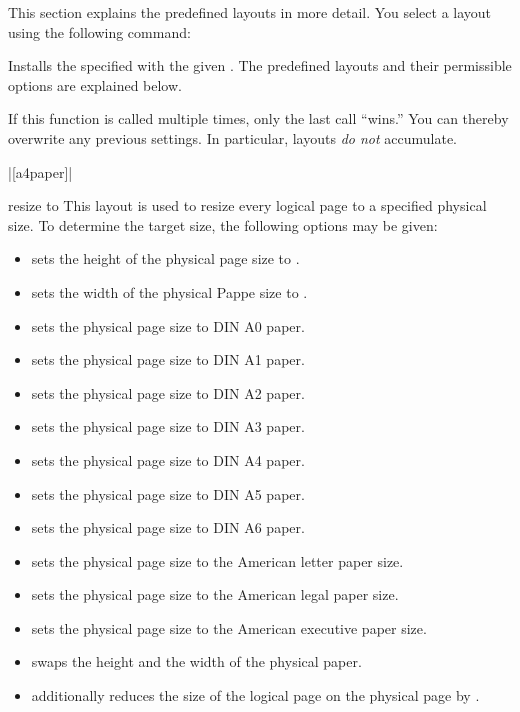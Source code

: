 This section explains the predefined layouts in more detail. You
select a layout using the following command:
\begin{command}{\pgfpagesuselayout{}}
  Installs the specified  with the given . The predefined layouts and their permissible options are
  explained below.

  If this function is called multiple times, only the last call
  ``wins.'' You can thereby overwrite any previous settings. In
  particular, layouts \emph{do not} accumulate.

  \example |[a4paper]|
\end{command}

\begin{pgflayout}{resize to}
  This layout is used to resize every logical page to a specified
  physical size. To determine the target size, the following options
  may be given:
  \begin{itemize}
  \item
     sets the
    height of the physical page size to .
  \item
     sets the
    width of the physical Pappe size to .
  \item
     sets the physical page size to DIN A0 paper.
  \item
     sets the physical page size to DIN A1 paper.
  \item
     sets the physical page size to DIN A2 paper.
  \item
     sets the physical page size to DIN A3 paper.
  \item
     sets the physical page size to DIN A4 paper.
  \item
     sets the physical page size to DIN A5 paper.
  \item
     sets the physical page size to DIN A6 paper.
  \item
     sets the physical page size to the
    American letter paper size.
  \item
     sets the physical page size to the
    American legal paper size.
  \item
     sets the physical page size to the
    American executive paper size.
  \item
     swaps the height and the width of the
    physical paper.
  \item
     additionally reduces the
    size of the logical page on the physical page by .
  \end{itemize}
\end{pgflayout}

